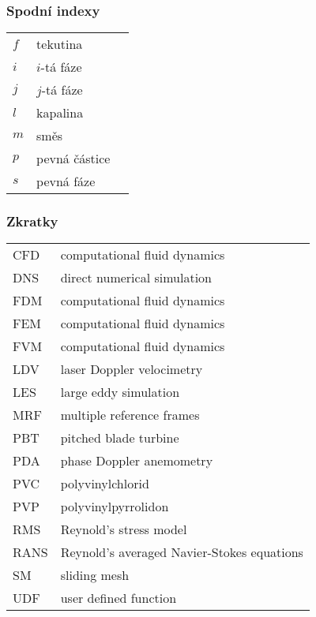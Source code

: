 \subsubsection*{Spodní indexy}
\begin{tabularx}{\textwidth}{@{}p{2.5cm} X r@{}}

$f$ & tekutina & \\
$i$ & $i$-tá fáze & \\
$j$ & $j$-tá fáze & \\
$l$ & kapalina & \\
$m$ & směs & \\
$p$ & pevná částice & \\
$s$ & pevná fáze & \\
\end{tabularx}

\subsubsection*{Zkratky}
\begin{tabularx}{\textwidth}{@{}p{2.5cm} X }
	
CFD & computational fluid dynamics  \\
DNS & direct numerical simulation \\
FDM & computational fluid dynamics  \\
FEM & computational fluid dynamics  \\
FVM & computational fluid dynamics  \\
LDV & laser Doppler velocimetry  \\
LES & large eddy simulation \\
MRF & multiple reference frames \\
PBT & pitched blade turbine \\
PDA & phase Doppler anemometry \\
PVC & polyvinylchlorid \\
PVP & polyvinylpyrrolidon \\
RMS & Reynold's stress model\\
RANS & Reynold's averaged Navier-Stokes equations \\
SM & sliding mesh \\
UDF & user defined function \\
\end{tabularx}
